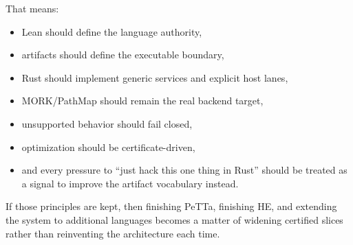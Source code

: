 \documentclass[11pt]{article}
\begin{document}
That means:
\begin{itemize}
  \item Lean should define the language authority,
  \item artifacts should define the executable boundary,
  \item Rust should implement generic services and explicit host lanes,
  \item MORK/PathMap should remain the real backend target,
  \item unsupported behavior should fail closed,
  \item optimization should be certificate-driven,
  \item and every pressure to ``just hack this one thing in Rust'' should be treated as a signal to improve the artifact vocabulary instead.
\end{itemize}

If those principles are kept, then finishing PeTTa, finishing HE, and extending the system to additional languages becomes a matter of widening certified slices rather than reinventing the architecture each time.
\end{document}
